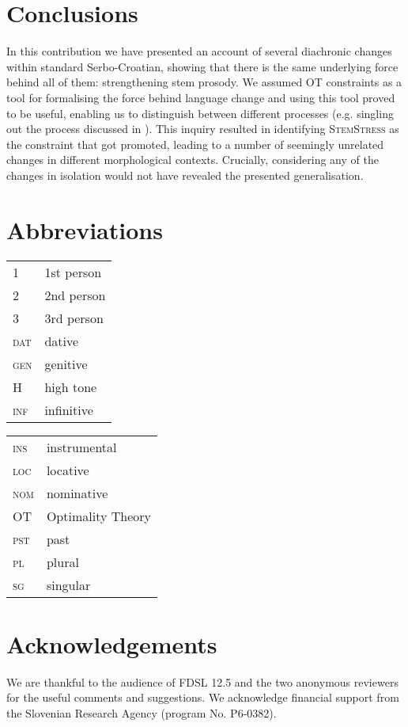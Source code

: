 \documentclass[output=paper,modfonts,nonflat
]{langsci/langscibook}
\begin{document}
\section{Conclusions} \label{sec:kager:6}

In this contribution we have presented an account of several diachronic changes within standard Serbo-Croatian, showing that there is the same underlying force behind all of them: strengthening stem prosody. We assumed OT constraints as a tool for formalising the force behind language change and using this tool proved to be useful, enabling us to distinguish between different processes (e.g. singling out the process discussed in  ). This inquiry resulted in identifying \textsc{StemStress} as the constraint that got promoted, leading to a number of seemingly unrelated changes in different morphological contexts. Crucially, considering any of the changes in isolation would not have revealed the presented generalisation.

\section*{Abbreviations}

\begin{tabularx}{.45\textwidth}{lX}
\textsc{1}&1st person\\
\textsc{2}&2nd person\\
\textsc{3}&3rd person\\
\textsc{dat}&dative\\
\textsc{gen}&genitive\\
H&high tone\\
\textsc{inf}&infinitive\\
\end{tabularx}
\begin{tabularx}{.45\textwidth}{lX}
\textsc{ins}&instrumental\\
\textsc{loc}&locative\\
\textsc{nom}&nominative\\
OT&Optimality Theory\\
\textsc{\textsc{pst}}&past\\
\textsc{pl}&plural\\
\textsc{sg}&singular\\
\end{tabularx}

\section*{Acknowledgements}

We are thankful to the audience of FDSL 12.5 and the two anonymous reviewers for the useful comments and suggestions. We acknowledge financial support from the Slovenian Research Agency (program No. P6-0382).


\sloppy
\printbibliography[heading=subbibliography,notkeyword=this]
\end{document}
